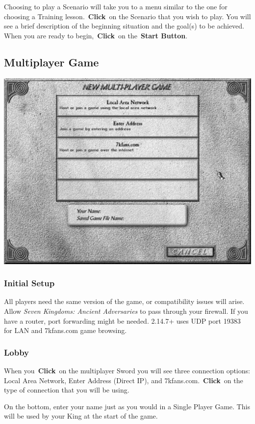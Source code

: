Choosing to play a Scenario will take you to a menu similar to the one for choosing a Training lesson. \textbf{Click} on the Scenario that you wish to play. You will see a brief description of the beginning situation and the goal(s) to be achieved. When you are ready to begin, \textbf{Click} on the \textbf{Start Button}.

\subsection{Multiplayer Game} 

\begin{center}
	\includegraphics[width=0.7\linewidth]{Imultiplayer}
\end{center}

\subsubsection{Initial Setup}

All players need the same version of the game, or compatibility issues will arise. Allow \textit{Seven Kingdoms: Ancient Adversaries} to pass through your firewall. If you have a router, port forwarding might be needed. 2.14.7+ uses UDP port 19383 for LAN and 7kfans.com game browsing.

\subsubsection{Lobby }

When you \textbf{Click} on the multiplayer Sword you will see three connection options: Local Area Network, Enter Address (Direct IP), and 7kfans.com. \textbf{Click} on the type of connection that you will be using.

On the bottom, enter your name just as you would in a Single Player Game. This will be used by your King at the start of the game.

